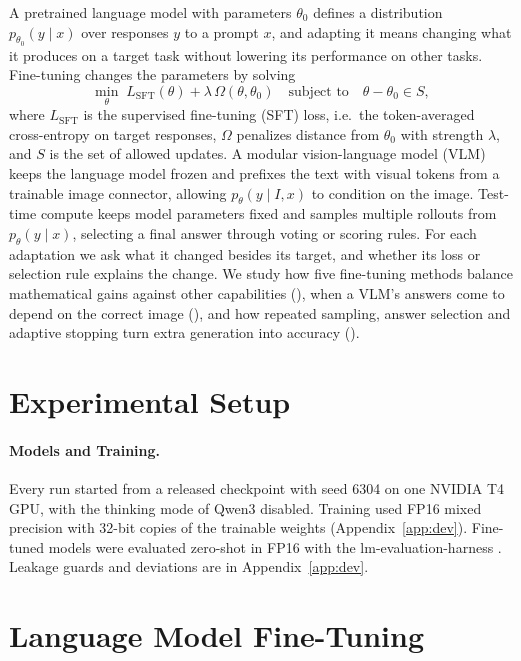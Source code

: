 \documentclass{article}
\begin{document}
A pretrained language model with parameters $\theta_0$ defines a distribution $p_{\theta_0}(y\mid x)$ over responses $y$ to a prompt $x$, and adapting it means changing what it produces on a target task without lowering its performance on other tasks. Fine-tuning changes the parameters by solving
\begin{equation}
\label{eq:ft}
\min_\theta\; L_{\mathrm{SFT}}(\theta)+\lambda\,\Omega(\theta,\theta_0)\quad\text{subject to}\quad\theta-\theta_0\in S,
\end{equation}
where $L_{\mathrm{SFT}}$ is the supervised fine-tuning (SFT) loss, i.e.\ the token-averaged cross-entropy on target responses, $\Omega$ penalizes distance from $\theta_0$ with strength $\lambda$, and $S$ is the set of allowed updates. A modular vision-language model (VLM) keeps the language model frozen and prefixes the text with visual tokens from a trainable image connector, allowing $p_\theta(y\mid I,x)$ to condition on the image. Test-time compute keeps model parameters fixed and samples multiple rollouts from $p_\theta(y\mid x)$, selecting a final answer through voting or scoring rules. For each adaptation we ask what it changed besides its target, and whether its loss or selection rule explains the change. We study how five fine-tuning methods balance mathematical gains against other capabilities (), when a VLM's answers come to depend on the correct image (), and how repeated sampling, answer selection and adaptive stopping turn extra generation into accuracy ().

\section{Experimental Setup}
\label{sec:setup}
\paragraph{Models and Training.} Every run started from a released checkpoint with seed 6304 on one NVIDIA T4 GPU, with the thinking mode of Qwen3 disabled. Training used FP16 mixed precision with 32-bit copies of the trainable weights (Appendix~\ref{app:dev}). Fine-tuned models were evaluated zero-shot in FP16 with the lm-evaluation-harness \citep{lmeval}. Leakage guards and deviations are in Appendix~\ref{app:dev}.

\section{Language Model Fine-Tuning}
\label{sec:t1}
\end{document}
